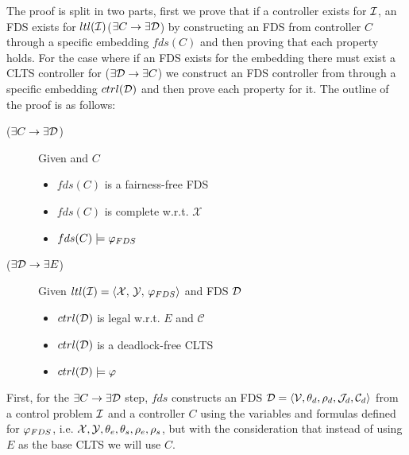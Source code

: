 
The proof is split in two parts, first we prove that if a controller exists for $\mathcal{I}$, an FDS exists for $ltl(\mathcal{I})$($\exists C \rightarrow \exists \mathcal{D}$) by constructing an FDS from controller $C$ through a specific embedding $fds(C)$ and then proving that each property holds. For the case where if an FDS \fdsD exists for the embedding \fdsEmbedding there must exist a CLTS controller for \controlProblem ($\exists \mathcal{D} \rightarrow \exists C$) we construct an FDS controller from \fdsD through a specific embedding $ctrl(\mathcal{D})$ and then prove each property for it. The outline of the proof is as follows:

\begin{description}
	\item[($\exists C \rightarrow \exists \mathcal{D}$)] Given \controlProblemDef and $C$
		\begin{itemize}
			\item $fds(C)$ is a fairness-free FDS			
			\item $fds(C)$ is complete w.r.t. $\mathcal{X}$
			\item $fds(C) \models \varphi_{FDS}$
		\end{itemize}
	\item[($\exists \mathcal{D} \rightarrow \exists E$)] Given $\fdsEmbeddingDef$ and FDS $\mathcal{D}$
		\begin{itemize}
			\item $ctrl(\mathcal{D})$ is legal w.r.t. $E$ and $\mathcal{C}$
			\item $ctrl(\mathcal{D})$ is a deadlock-free CLTS			
			\item $ctrl(\mathcal{D}) \models \varphi$
		\end{itemize}	
\end{description}

First,  for the $\exists C \rightarrow \exists \mathcal{D}$ step, $fds$ constructs an FDS $\mathcal{D}=\langle \mathcal V, \theta_d, \rho_d, \mathcal{J}_d, \mathcal{C}_d \rangle$ from a control problem $\mathcal{I}$ and a controller $C$ using the variables and formulas defined for $\varphi_{FDS}$, i.e. ${\mathcal{X}}, {\mathcal{Y}}, {\theta_e}, {\theta_s}, {\rho_e}, {\rho_s}$, but with the consideration that instead of using $E$ as the base CLTS we will use $C$.

